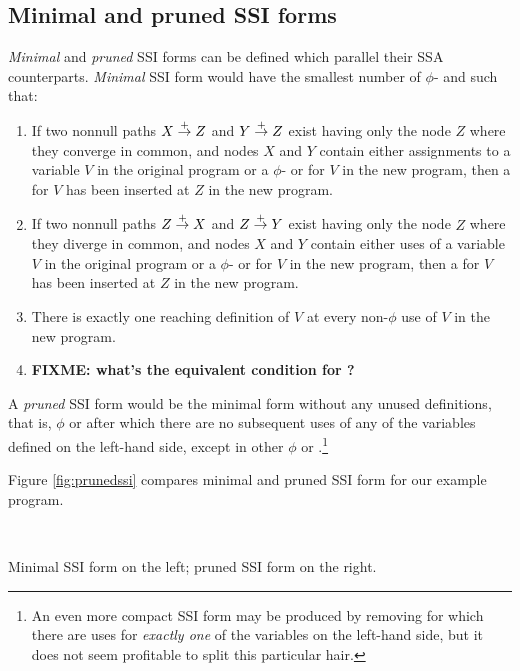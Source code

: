 \documentclass[12pt,notitlepage]{article}
\begin{document}
\subsection{Minimal and pruned SSI forms}
\emph{Minimal} and \emph{pruned} SSI forms can be defined which
parallel their SSA counterparts.  \emph{Minimal} SSI form would have the
smallest number of $\phi$- and  such that:
\begin{enumerate}
\item If two nonnull paths $X \stackrel{+}{\rightarrow} Z$ and $Y \stackrel{+}{\rightarrow} Z$
exist having only the node $Z$ where they converge in common,
and nodes $X$ and $Y$ contain either assignments to a variable $V$ in the
original program or a $\phi$- or \sigfunction{} for $V$ in the new program,
then a \phifunction{} for $V$ has been inserted at $Z$ in the new program.
\item If two nonnull paths $Z \stackrel{+}{\rightarrow} X$ and $Z \stackrel{+}{\rightarrow} Y$
exist having only the node $Z$ where they diverge in common,
and nodes $X$ and $Y$ contain either uses of a variable $V$ in the
original program or a $\phi$- or \sigfunction{} for $V$ in the new program,
then a \sigfunction{} for $V$ has been inserted at $Z$ in the new program.
\item There is exactly one reaching definition of $V$ at every
non-$\phi$ use of $V$ in the new program.
\item \textbf{FIXME: what's the equivalent condition for ?}
\end{enumerate}

A \emph{pruned} SSI form would be the minimal form without any unused
definitions, that is, $\phi$ or  after which there are no
subsequent uses of any of the variables defined on the left-hand side,
except in other $\phi$ or .\footnote{An even more
compact SSI form may be produced by removing  for which
there are uses for \emph{exactly one} of the variables on the
left-hand side, but it does not seem profitable to split this
particular hair.}

Figure \ref{fig:prunedssi} compares minimal and pruned SSI form for
our example program.
\begin{myfigure}
\begin{center}
 \vline\ 
\end{center}
\caption{Minimal SSI form on the left; pruned SSI form on the right.}
\label{fig:prunedssi}
\end{myfigure}
\end{document}
